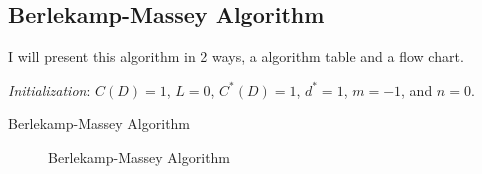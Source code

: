 




\subsection{Berlekamp-Massey Algorithm}\label{subsec:Berlekamp_Massey_Algorithm}
I will present this algorithm in 2 ways, a algorithm table and a flow chart.

\begin{algorithm}[H]
  \DontPrintSemicolon{}
  
  \BlankLine{}
  \textit{Initialization}: $C(D) = 1$, $L=0$, $C^{*}(D) = 1$, $d^{*} = 1$, $m = -1$, and $n=0$. \;
  \caption{Berlekamp-Massey Algorithm}
  \label{fig:Berlekamp_Massey_Algorithm}
\end{algorithm}

\begin{figure}[h!]
  \centering
  
  \caption{Berlekamp-Massey Algorithm}
  \label{fig:Berlekamp_Massey_Algorithm}
\end{figure}

